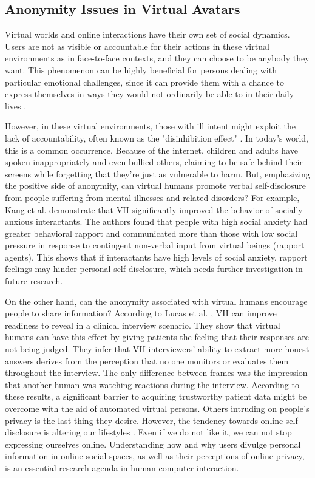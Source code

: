 \subsection{Anonymity Issues in Virtual Avatars}
Virtual worlds and online interactions have their own set of social dynamics. Users are not as visible or accountable for their actions in these virtual environments as in face-to-face contexts, and they can choose to be anybody they want. This phenomenon can be highly beneficial for persons dealing with particular emotional challenges, since it can provide them with a chance to express themselves in ways they would not ordinarily be able to in their daily lives \cite{LUC14, ROT19, BAT14}.

However, in these virtual environments, those with ill intent might exploit the lack of accountability, often known as the "disinhibition effect" \cite{WAN20, KUR18}. In today's world, this is a common occurrence. Because of the internet, children and adults have spoken inappropriately and even bullied others, claiming to be safe behind their screens while forgetting that they're just as vulnerable to harm. But, emphasizing the positive side of anonymity, can virtual humans promote verbal self-disclosure from people suffering from mental illnesses and related
disorders? For example, Kang et al. \cite{KAN10} demonstrate that VH significantly improved the behavior of socially anxious interactants. The authors found that people with high social anxiety had greater behavioral rapport and communicated more than those with low social pressure in response to contingent non-verbal input from virtual beings (rapport agents). This shows that if interactants have high levels of social anxiety, rapport feelings may hinder personal self-disclosure, which needs further investigation in future research.

On the other hand, can the anonymity associated with virtual humans encourage people to share information? According to Lucas et al. \cite{LUC14}, VH can improve readiness to reveal in a clinical interview scenario. They show that virtual humans can have this effect by giving patients the feeling that their responses are not being judged. They infer that VH interviewers' ability to extract more honest answers derives from the perception that no one monitors or evaluates them throughout the interview. The only difference between frames was the impression that another human was watching reactions during the interview. According to these results, a significant barrier to acquiring trustworthy patient data might be overcome with the aid of automated virtual persons. Others intruding on people's privacy is the last thing they desire. However, the tendency towards online self-disclosure is altering our lifestyles \cite{ELE14}. Even if we do not like it, we can not stop expressing ourselves online. Understanding how and why users divulge personal information in online social spaces, as well as their perceptions of online privacy, is an essential research agenda in human-computer interaction. 

